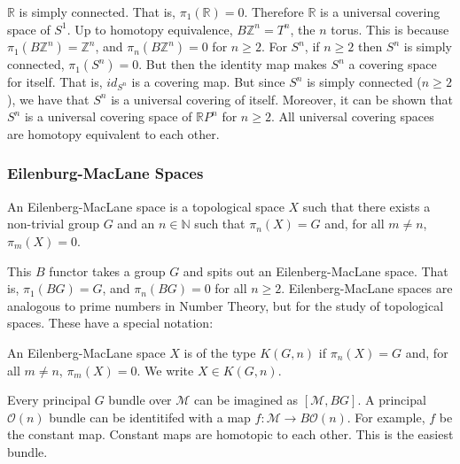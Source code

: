 \documentclass[crop=false,class=book,oneside]{standalone}                      %
\begin{document}
            $\mathbb{R}$ is simply connected. That is,
            $\pi_{1}(\mathbb{R})=0$. Therefore $\mathbb{R}$ is a
            universal covering space of $S^{1}$. Up to homotopy equivalence,
            $B\mathbb{Z}^{n}=T^{n}$, the $n$ torus. This is because
            $\pi_{1}(B\mathbb{Z}^{n})=\mathbb{Z}^{n}$, and
            $\pi_{n}(B\mathbb{Z}^{n})=0$ for $n\geq{2}$.
            For $S^{n}$, if $n\geq{2}$ then $S^{n}$ is simply connected,
            $\pi_{1}(S^{n})=0$. But then the identity map makes
            $S^{n}$ a covering space for itself. That is,
            $id_{S^{n}}$ is a covering map. But since $S^{n}$ is
            simply connected ($n\geq{2}$), we have that
            $S^{n}$ is a universal covering of itself.
            Moreover, it can be shown that
            $S^{n}$ is a universal covering space of
            $\mathbb{R}P^{n}$ for $n\geq{2}$.
            All universal covering spaces are homotopy
            equivalent to each other.
        \subsubsection{Eilenburg-MacLane Spaces}
            \begin{definition}
                An Eilenberg-MacLane space is a topological space
                $X$ such that there exists a non-trivial group
                $G$ and an $n\in\mathbb{N}$ such that
                $\pi_{n}(X)=G$ and, for all $m\ne{n}$,
                $\pi_{m}(X)=0$.
            \end{definition}
            This $B$ functor takes a group $G$ and spits out
            an Eilenberg-MacLane space. That is,
            $\pi_{1}(BG)=G$, and $\pi_{n}(BG)=0$ for all
            $n\geq{2}$. Eilenberg-MacLane spaces are analogous to
            prime numbers in Number Theory, but for the
            study of topological spaces. These have a
            special notation:
            \begin{notation}
                An Eilenberg-MacLane space $X$ is of the type
                $K(G,n)$ if $\pi_{n}(X)=G$ and, for all
                $m\ne{n}$, $\pi_{m}(X)=0$. We write
                $X\in{K(G,n)}$.
            \end{notation}
            Every principal $G$ bundle over $\mathcal{M}$
            can be imagined as $[\mathcal{M},BG]$.
            A principal $\mathcal{O}(n)$ bundle can be
            identitifed with a map
            $f:\mathcal{M}\rightarrow{B}\mathcal{O}(n)$.
            For example, $f$ be the constant map.
            Constant maps are homotopic to each other. This
            is the easiest bundle.
\end{document}
